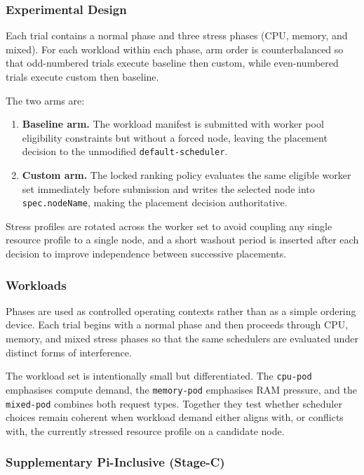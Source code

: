 \subsubsection{Experimental Design}

Each trial contains a normal phase and three stress phases (CPU, memory, and mixed). For each workload within each phase, arm order is counterbalanced so that odd-numbered trials execute baseline then custom, while even-numbered trials execute custom then baseline.

The two arms are:

\begin{enumerate}
\item \textbf{Baseline arm.} The workload manifest is submitted with worker pool eligibility constraints but without a forced node, leaving the placement decision to the unmodified \texttt{default-scheduler}.
\item \textbf{Custom arm.} The locked ranking policy evaluates the same eligible worker set immediately before submission and writes the selected node into \texttt{spec.nodeName}, making the placement decision authoritative.
\end{enumerate}

Stress profiles are rotated across the worker set to avoid coupling any single resource profile to a single node, and a short washout period is inserted after each decision to improve independence between successive placements.

\subsubsection{Workloads}

Phases are used as controlled operating contexts rather than as a simple ordering device. Each trial begins with a normal phase and then proceeds through CPU, memory, and mixed stress phases so that the same schedulers are evaluated under distinct forms of interference.

The workload set is intentionally small but differentiated. The \texttt{cpu-pod} emphasises compute demand, the \texttt{memory-pod} emphasises RAM pressure, and the \texttt{mixed-pod} combines both request types. Together they test whether scheduler choices remain coherent when workload demand either aligns with, or conflicts with, the currently stressed resource profile on a candidate node.

\subsubsection{Supplementary Pi-Inclusive  (Stage-C)}

